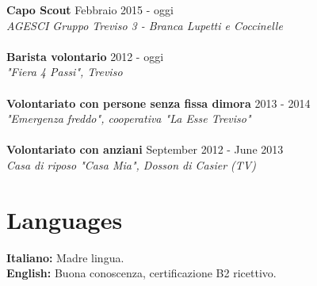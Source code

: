 \documentclass[margin, 10pt]{res}
\begin{document}
\begin{resume}
\textbf{Capo Scout} \hfill Febbraio 2015 - oggi \\
\textit{AGESCI Gruppo Treviso 3 - Branca Lupetti e Coccinelle} \\ \\
\textbf{Barista volontario} \hfill 2012 - oggi \\
\textit{"Fiera 4 Passi", Treviso} \\ \\
\textbf{Volontariato con persone senza fissa dimora} \hfill 2013 - 2014 \\
\textit{"Emergenza freddo", cooperativa "La Esse Treviso"} \\ \\
\textbf{Volontariato con anziani} \hfill September 2012 - June 2013 \\
\textit{Casa di riposo "Casa Mia", Dosson di Casier (TV)} 



\section{Languages}
\textbf{Italiano: } Madre lingua. \\
\textbf{English: } Buona conoscenza, certificazione B2 ricettivo.\\

\end{resume}
\end{document}
